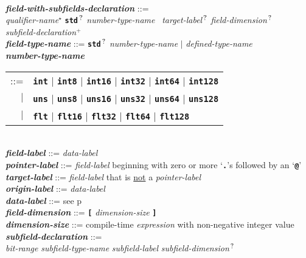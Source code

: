 \documentclass[12pt]{article}
\newcommand{\TT}[1]{{\tt \bfseries #1}}
\newcommand{\STAR}{{\Large $^\star$}}
\newcommand{\PLUS}[1][]{{$^{+#1}$}}
\newcommand{\QMARK}{{$^{\,\mbox{\footnotesize ?}}$}}
\newcommand{\ttkey}[1]{{\tt \bfseries #1}}
\newcommand{\emkey}[1]{{\em \bfseries #1}}
\newcommand{\pagref}[1]{p\pageref{#1}}
\newenvironment{indpar}[1][0.3in]%
	{\begin{list}{}%
		     {\setlength{\itemsep}{0in}%
		      \setlength{\topsep}{0in}%
		      \setlength{\parsep}{1ex}%
		      \setlength{\labelwidth}{#1}%
		      \setlength{\leftmargin}{#1}%
		      \addtolength{\leftmargin}{\labelsep}}%
	 \item}%
	{\end{list}}
\begin{document}
\begin{indpar}
\begin{tabular}{rl}
	\end{tabular}
\\[2ex]
\emkey{field-with-subfields-declaration} ::= \\
\hspace*{0.5in}
    {\em qualifier-name}\STAR{}
    \TT{std}\QMARK{} {\em number-type-name}~ {\em target-label}\QMARK{}
                {\em field-dimension}\QMARK{} \\
\hspace*{0.5in}
    {\em subfield-declaration}\PLUS{}
\\[2ex]
\emkey{field-type-name} ::= \TT{std}\QMARK{} {\em number-type-name}
                        $|$ {\em defined-type-name} \\
\emkey{number-type-name}
    \begin{tabular}[t]{@{}rl}
    ::= &  \ttkey{int} $|$ \ttkey{int8} $|$ \ttkey{int16} $|$ \ttkey{int32}
                       $|$ \ttkey{int64} $|$ \ttkey{int128} \\
    $|$ &  \ttkey{uns} $|$ \ttkey{uns8} $|$ \ttkey{uns16} $|$ \ttkey{uns32}
                       $|$ \ttkey{uns64} $|$ \ttkey{uns128} \\
    $|$ &  \ttkey{flt} $|$ \ttkey{flt16} $|$ \ttkey{flt32} $|$ \ttkey{flt64}
                         $|$ \ttkey{flt128} \\
    \end{tabular}
\\[2ex]
\emkey{field-label}\label{FIELD-LABEL} ::=  {\em data-label} \\
\emkey{pointer-label}\label{POINTER-LABEL} ::=
    {\em field-label} beginning with zero or more `\TT{.}'s followed by
    an `\TT{@}' \\
\emkey{target-label}\label{TARGET-LABEL} ::=
    {\em field-label} that is \underline{not} a {\em pointer-label} \\
\emkey{origin-label}\label{ORIGIN-LABEL} ::=  {\em data-label} \\
\emkey{data-label} ::=  see \pagref{DATA-LABEL}
\\[2ex]
\emkey{field-dimension} ::=  \TT{[} {\em dimension-size} \TT{]} \\
\emkey{dimension-size} ::=  compile-time {\em expression}
			    with non-negative integer value
\\[2ex]
\emkey{subfield-declaration} ::= \\
\hspace*{0.5in}
    {\em bit-range} {\em subfield-type-name} {\em subfield-label}
    		{\em subfield-dimension}\QMARK{} \\

\end{indpar}
\end{document}
